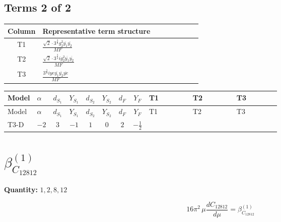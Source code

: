 \documentclass[8pt]{article}
\begin{document}
\begin{landscape}
\subsection*{Terms 2 of 2}
\begin{center}
\begin{tabular}{@{}c >{\raggedright\arraybackslash}p{0.82\linewidth}@{}}
\toprule
Column & Representative term structure \\
\midrule
T1 & \(\displaystyle \frac{\sqrt{2} \cdot 3^{\frac{3}{4}} g_{2}^{2} \overline{y_{1}} \overline{y_{2}}}{MF}\) \\
\midrule
T2 & \(\displaystyle \frac{\sqrt{2} \cdot 3^{\frac{3}{4}} i g_{2}^{2} \overline{y_{1}} \overline{y_{2}}}{MF}\) \\
\midrule
T3 & \(\displaystyle \frac{3^{\frac{3}{4}} i ye \overline{y_{1}} \overline{y_{2}} \overline{ye}}{MF}\) \\
\midrule
\bottomrule
\end{tabular}
\end{center}
\smallskip
\tiny
\begin{longtable}{@{}llcccccc >{\raggedright\arraybackslash}p{0.21\linewidth} >{\raggedright\arraybackslash}p{0.21\linewidth} >{\raggedright\arraybackslash}p{0.21\linewidth}@{}}
\toprule
Model & $\alpha$ & $d_{S_1}$ & $Y_{S_1}$ & $d_{S_2}$ & $Y_{S_2}$ & $d_F$ & $Y_F$ & T1 & T2 & T3 \\
\midrule
\endfirsthead
\toprule
Model & $\alpha$ & $d_{S_1}$ & $Y_{S_1}$ & $d_{S_2}$ & $Y_{S_2}$ & $d_F$ & $Y_F$ & T1 & T2 & T3 \\
\midrule
\endhead
T3-D & $-2$ & $3$ & $-1$ & $1$ & $0$ & $2$ & $-\frac{1}{2}$ & \scriptsize\adjustbox{max width=\linewidth}{$\begin{gathered} \frac{\sqrt{2} \cdot 3^{\frac{3}{4}} g_{2}^{2} \overline{y_{1}} \overline{y_{2}}}{6 MF}\end{gathered}$} & \scriptsize\adjustbox{max width=\linewidth}{$\begin{gathered} - \frac{\sqrt{2} \cdot 3^{\frac{3}{4}} i g_{2}^{2} \overline{y_{1}} \overline{y_{2}}}{6 MF}\end{gathered}$} & \scriptsize\adjustbox{max width=\linewidth}{$\begin{gathered} \frac{3^{\frac{3}{4}} i ye \overline{y_{1}} \overline{y_{2}} \overline{ye}}{12 MF}\end{gathered}$} \\
\midrule
\bottomrule
\end{longtable}
\clearpage
\section*{$\beta_{C_{12812}}^{(1)}$}
\noindent\textbf{Quantity: }$\mathrm{1,2,8,12}$\par\smallskip
\[16\pi^2\,\mu\frac{d C_{12812}}{d\mu}=\beta_{C_{12812}}^{(1)}\]

\end{landscape}
\end{document}
